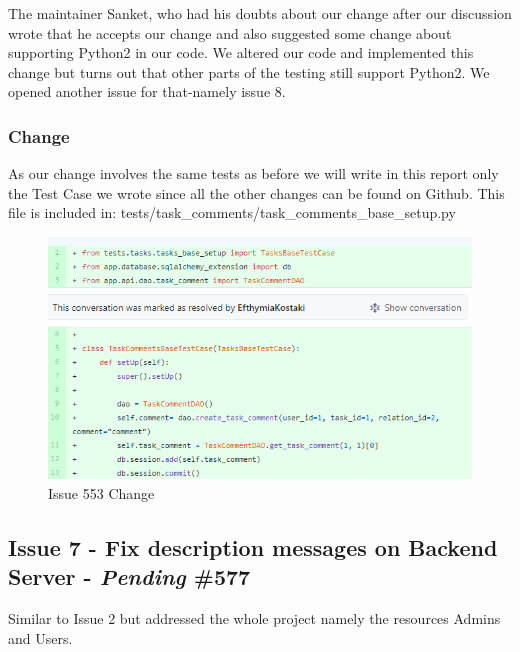\documentclass{article}
\begin{document}
The maintainer Sanket, who had his doubts about our change after our discussion wrote that he accepts our change and also suggested some change about supporting Python2 in our code. We altered our code and implemented this change but turns out that other parts of the testing still support Python2. We opened another issue for that-namely issue 8. 

\subsubsection{Change}
\hspace{0.5cm}As our change involves the same tests as before we will write in this report only the Test Case we wrote since all the other changes can be found on Github. This file is included in: tests/task\_comments/task\_comments\_base\_setup.py

\begin{figure}[tph!]
\centerline{\includegraphics[totalheight=7cm, width=15cm]{issue553-change.png}}
    \caption{Issue 553 Change}
    \label{fig:verticalcell}
\end{figure}
\vfill
\clearpage

\subsection{Issue 7 - Fix description messages on Backend Server - \emph{Pending}  \#577}
Similar to Issue 2 but addressed the whole project namely the resources Admins and Users.
\end{document}

